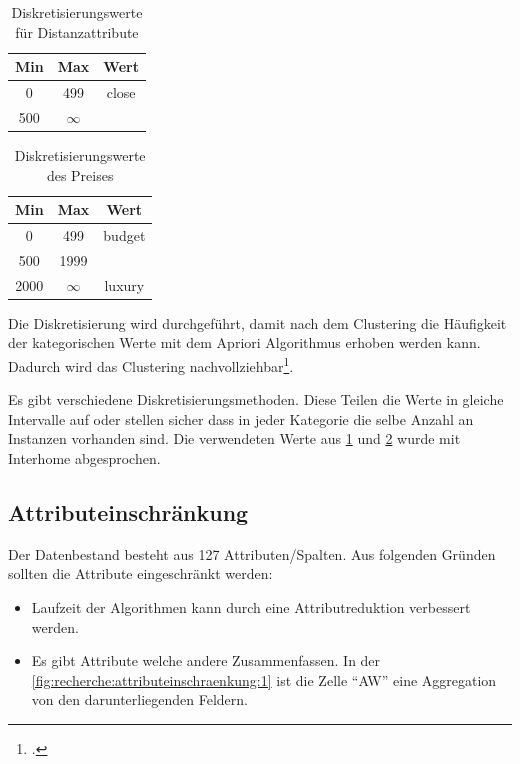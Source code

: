 \begin{table}[h] 
	\caption{Diskretisierungswerte für Distanzattribute}
	\centering
	\label{fig:recherche:datenvorbereitung:1}
	\begin{tabular}{ | c | c | c | } 
		\hline 
		\rowcolor{tableheadcolor}
		\bfseries Min & \bfseries Max & \bfseries Wert \\ \hline 
		0 & 499 & close \\ \hline 
		500 & $\infty$ &   \\ \hline 
	\end{tabular}
\end{table}

\begin{table}[h] 
	\caption{Diskretisierungswerte des Preises}
	\centering
	\label{fig:recherche:datenvorbereitung:2}
	\begin{tabular}{ | c | c | c | } 
		\hline 
		\rowcolor{tableheadcolor}
		\bfseries Min & \bfseries Max & \bfseries Wert \\ \hline 
		0 & 499 & budget \\ \hline 
		500 & 1999 &  \\ \hline 
		2000 & $\infty$ & luxury \\ \hline 
	\end{tabular}
\end{table}

Die Diskretisierung wird durchgeführt, damit nach dem Clustering die Häufigkeit der kategorischen Werte mit dem Apriori Algorithmus erhoben werden kann. Dadurch wird das Clustering nachvollziehbar\footcite{data_mining_concepts_and_techniques}. 

Es gibt verschiedene Diskretisierungsmethoden. Diese Teilen die Werte in gleiche Intervalle auf oder stellen sicher dass in jeder Kategorie die selbe Anzahl an Instanzen vorhanden sind.
Die verwendeten Werte aus \cref{fig:recherche:datenvorbereitung:1} und \cref{fig:recherche:datenvorbereitung:2} wurde mit Interhome abgesprochen. 

\subsection{Attributeinschränkung}
\label{sec:recherche:attributeinschraenkung}
Der Datenbestand besteht aus 127 Attributen/Spalten. Aus folgenden Gründen sollten die Attribute eingeschränkt werden:
\begin{itemize}
\item Laufzeit der Algorithmen kann durch eine Attributreduktion verbessert werden.
\item Es gibt Attribute welche andere Zusammenfassen. In der \cref{fig:recherche:attributeinschraenkung:1} ist die Zelle "`AW"' eine Aggregation von den darunterliegenden Feldern.
\end{itemize}

